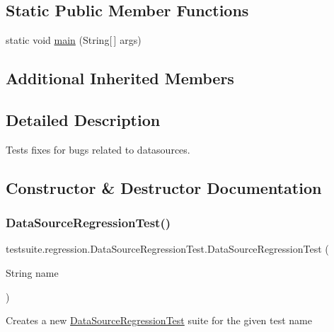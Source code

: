 \subsection*{Static Public Member Functions}
\begin{DoxyCompactItemize}
\item 
static void \mbox{\hyperlink{classtestsuite_1_1regression_1_1_data_source_regression_test_a0d381bc3c72a7d395cb47e226208071d}{main}} (String\mbox{[}$\,$\mbox{]} args)
\end{DoxyCompactItemize}
\subsection*{Additional Inherited Members}


\subsection{Detailed Description}
Tests fixes for bugs related to datasources. 

\subsection{Constructor \& Destructor Documentation}
\mbox{\label{classtestsuite_1_1regression_1_1_data_source_regression_test_ab2c694d826548de54ca0b8397a78293c}} 
\subsubsection{\texorpdfstring{Data\+Source\+Regression\+Test()}{DataSourceRegressionTest()}}
{\footnotesize\ttfamily testsuite.\+regression.\+Data\+Source\+Regression\+Test.\+Data\+Source\+Regression\+Test (\begin{DoxyParamCaption}\item[{String}]{name }\end{DoxyParamCaption})}

Creates a new \mbox{\hyperlink{classtestsuite_1_1regression_1_1_data_source_regression_test}{Data\+Source\+Regression\+Test}} suite for the given test name


